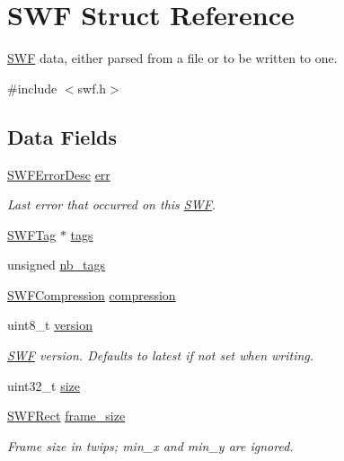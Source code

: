 \hypertarget{struct_s_w_f}{\section{S\-W\-F Struct Reference}
\label{struct_s_w_f}
}


\hyperlink{struct_s_w_f}{S\-W\-F} data, either parsed from a file or to be written to one.  




{\ttfamily \#include $<$swf.\-h$>$}

\subsection*{Data Fields}
\begin{DoxyCompactItemize}
\item 
\hyperlink{struct_s_w_f_error_desc}{S\-W\-F\-Error\-Desc} \hyperlink{struct_s_w_f_afd3f84db8c0aa52bd4923cb23f81ea0b}{err}
\begin{DoxyCompactList}\small\item\em Last error that occurred on this \hyperlink{struct_s_w_f}{S\-W\-F}. \end{DoxyCompactList}\item 
\hyperlink{struct_s_w_f_tag}{S\-W\-F\-Tag} $\ast$ \hyperlink{struct_s_w_f_a27238e7bdf4bb8961159b4c4a8913580}{tags}
\item 
unsigned \hyperlink{struct_s_w_f_ae9a2ba32a4a650ec76d45cc5211f77b0}{nb\-\_\-tags}
\item 
\hyperlink{swf_8h_ab2a10479850ea02b88a9da760188f9e8}{S\-W\-F\-Compression} \hyperlink{struct_s_w_f_a6431142bed21f16383a18d8a3f8a19d1}{compression}
\item 
uint8\-\_\-t \hyperlink{struct_s_w_f_aafcab8c367361cc18461b683b9278ad0}{version}
\begin{DoxyCompactList}\small\item\em \hyperlink{struct_s_w_f}{S\-W\-F} version. Defaults to latest if not set when writing. \end{DoxyCompactList}\item 
uint32\-\_\-t \hyperlink{struct_s_w_f_a5e4ec5c09472acb241a3122606d833b2}{size}
\item 
\hyperlink{struct_s_w_f_rect}{S\-W\-F\-Rect} \hyperlink{struct_s_w_f_afba7a69a7d2cd1fff8fcfd7ed2007c96}{frame\-\_\-size}
\begin{DoxyCompactList}\small\item\em Frame size in twips; min\-\_\-x and min\-\_\-y are ignored. \end{DoxyCompactList}\item 

\end{DoxyCompactItemize}
